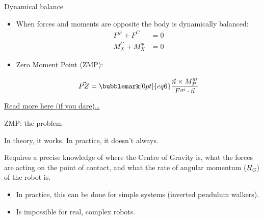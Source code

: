 \documentclass[compress]{beamer}
\begin{document}
\begin{frame}{Dynamical balance}

    \begin{itemize}

        \item When forces and moments are opposite the body is dynamically balanced:
            \begin{align*}
                F^{gi} + F^C &= 0 \\
                M_X^C + M_X^{gi} &= 0
            \end{align*}

        \item Zero Moment Point (ZMP):

            \[
                \vec{PZ} =\bubblemark[0pt]{eq6} \frac{\vec{n} \times M_P^{gi}}{F^{gi}\cdot \vec{n}}
            \]

    \end{itemize}


    \vspace{4em}

    \href{http://ieeexplore.ieee.org/stamp/stamp.jsp?tp=\&arnumber=1325327}{Read
    more here (if you dare)\ldots{}}

\end{frame}

\begin{frame}{ZMP: the problem}

    In theory, it works. In practice, it doesn't always.

    Requires a precise knowledge of where the Centre of Gravity is, what the
    forces are acting on the point of contact, and what the rate of angular
    momentum ($\dot{H}_G$) of the robot is.

    \begin{itemize}

        \item In practice, this can be done for simple systems (inverted pendulum
            walkers).
        \item Is impossible for real, complex robots.
    \end{itemize}

\end{frame}
\end{document}
